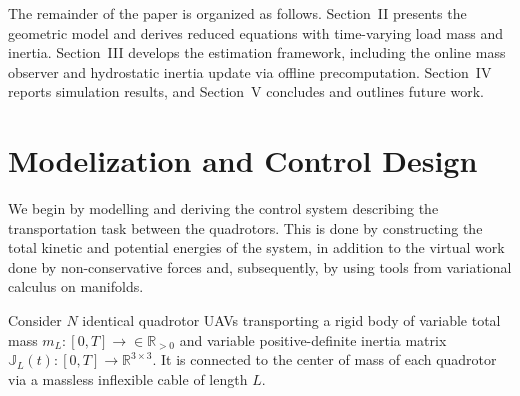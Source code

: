\documentclass[letterpaper, 10 pt, conference]{ieeeconf}  %
\begin{document}
The remainder of the paper is organized as follows. Section~II presents the geometric model and derives reduced equations with time-varying load mass and inertia. Section~III develops the estimation framework, including the online mass observer and hydrostatic inertia update via offline precomputation. Section~IV reports simulation results, and Section~V concludes and outlines future work.


\section{Modelization and Control Design}\label{sec3}
We begin by modelling and deriving the control system describing the transportation task between the quadrotors. This is done by constructing the total kinetic and potential energies of the system, in addition to the virtual work done by non-conservative forces and, subsequently, by using tools from variational calculus on manifolds. 

Consider $N$ identical quadrotor UAVs transporting a rigid body of variable total mass $m_{L}: [0, T] \to \in\mathbb{R}_{>0}$ and variable positive-definite inertia matrix $\mathbb{J}_{L}(t): [0, T] \to \mathbb{R}^{3\times 3}$. It is connected to the center of mass of each quadrotor via a massless inflexible cable of length $L$. %

\end{document}
